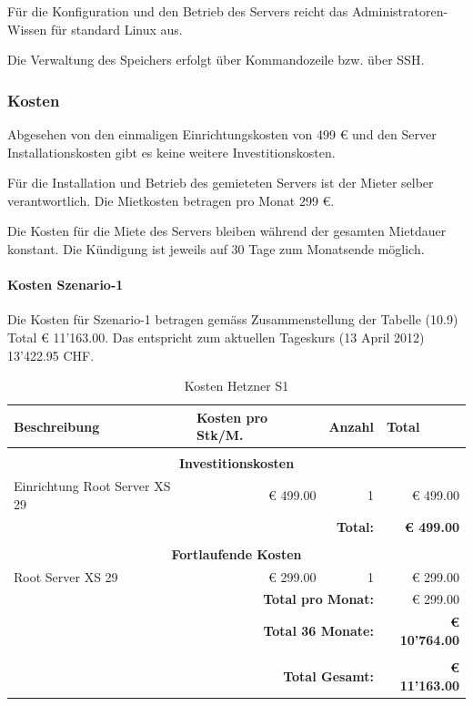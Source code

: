 Für die Konfiguration und den Betrieb des Servers reicht das Administratoren-Wissen für standard Linux aus.

Die Verwaltung des Speichers erfolgt über Kommandozeile bzw. über \gls{SSH}.

\subsubsection*{Kosten}
Abgesehen von den einmaligen Einrichtungskosten von 499 € und den Server Installationskosten gibt es keine weitere Investitionskosten. 

Für die Installation und Betrieb des gemieteten Servers ist der Mieter selber verantwortlich. Die Mietkosten betragen pro Monat 299 €.

Die Kosten für die Miete des Servers bleiben während der gesamten Mietdauer konstant. Die Kündigung ist jeweils auf 30 Tage zum Monatsende möglich. 

\paragraph*{Kosten Szenario-1}
Die Kosten für Szenario-1 betragen gemäss Zusammenstellung der Tabelle (10.9) Total € 11'163.00. Das entspricht zum aktuellen Tageskurs (13 April 2012) 13'422.95 CHF.

\begin{table}[htbp]
\caption{Kosten Hetzner S1}
\begin{small}
\begin{tabular}{|l|r|r|r|}
\hline
\textbf{Beschreibung} & \multicolumn{1}{l|}{\textbf{Kosten pro Stk/M.}} & \multicolumn{1}{l|}{\textbf{Anzahl}} & \multicolumn{1}{l|}{\textbf{Total}} \\ \hline
 \multicolumn{ 4}{c}{} \\ \hline
\multicolumn{ 4}{|c|}{\textbf{Investitionskosten}} \\ \hline
Einrichtung Root Server XS 29 & € 499.00 & 1 & € 499.00 \\ \hline \hline
 \multicolumn{ 3}{r|}{\textbf{Total:}} & \textbf{€ 499.00} \\ 
 \cline{4-4}
\multicolumn{ 4}{c}{} \\ \hline
\multicolumn{ 4}{|c|}{\textbf{Fortlaufende Kosten}} \\ \hline
Root Server XS 29 & € 299.00 & 1 & € 299.00 \\ \hline \hline
 \multicolumn{ 3}{r|}{\textbf{Total pro Monat:}} & € 299.00 \\
\cline{4-4}
 \multicolumn{ 3}{r|}{\textbf{Total 36 Monate:}} & \textbf{€ 10'764.00} \\ \cline{4-4}
 \multicolumn{ 4}{c}{} \\ \cline{4-4}
 \multicolumn{ 3}{r|}{\textbf{Total Gesamt:}} & \textbf{€ 11'163.00} \\ \cline{4-4}
\end{tabular}
\end{small}
\label{KostenHetznerS1}
\end{table}


